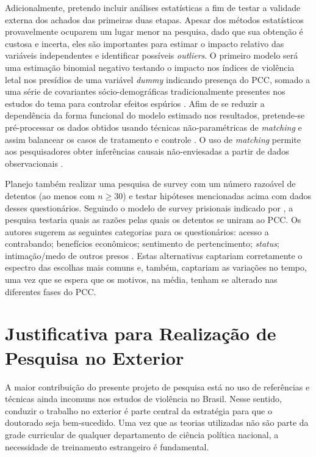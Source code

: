 \documentclass[a4paper,11pt]{article}
\begin{document}
Adicionalmente, pretendo incluir análises estatísticas a fim de testar a validade externa dos achados das primeiras duas etapas. Apesar dos métodos estatísticos provavelmente ocuparem um lugar menor na pesquisa, dado que sua obtenção é custosa e incerta, eles são importantes para estimar o impacto relativo das variáveis independentes e identificar possíveis \textit{outliers}. O primeiro modelo será uma estimação binomial negativo testando o impacto nos índices de violência letal nos presídios de uma variável \textit{dummy} indicando presença do PCC, somado a uma série de covariantes sócio-demográficas tradicionalmente presentes nos estudos do tema para controlar efeitos espúrios \citep{delisi2004gang}. Afim de se reduzir a dependência da forma funcional do modelo estimado nos resultados, pretende-se pré-processar os dados obtidos usando técnicas não-paramétricas de \textit{matching} e assim balancear os casos de tratamento e controle \citep{ho2007matching}. O uso de \textit{matching} permite aos pesquisadores obter inferências causais não-enviesadas a partir de dados observacionais \citep{angrist2008mostly}.

Planejo também realizar uma pesquisa de survey com um número razoável de detentos (ao menos com $n \geq 30$) e testar hipóteses mencionadas acima com dados desses questionários. Seguindo o modelo de survey prisionais indicado por \citet{winterdyk2010managing}, a pesquisa testaria quais as razões pelas quais os detentos se uniram ao PCC. Os autores sugerem as seguintes categorias para os questionários: acesso a contrabando; benefícios econômicos; sentimento de pertencimento; \textit{status}; intimação/medo de outros presos \citep[734]{winterdyk2010managing}. Estas alternativas captariam corretamente o espectro das escolhas mais comuns e, também, captariam as variações no tempo, uma vez que se espera que os motivos, na média, tenham se alterado nas diferentes fases do PCC.

\section{Justificativa para Realização de Pesquisa no Exterior}

A maior contribuição do presente projeto de pesquisa está no uso de referências e técnicas ainda incomuns nos estudos de violência no Brasil. Nesse sentido, conduzir o trabalho no exterior é parte central da estratégia para que o doutorado seja bem-sucedido. Uma vez que as teorias utilizadas não são parte da grade curricular de qualquer departamento de ciência política nacional, a necessidade de treinamento estrangeiro é fundamental.
\end{document}
